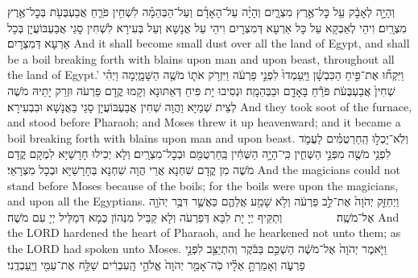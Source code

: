 {%
{וְהָיָ֣ה לְאָבָ֔ק עַ֖ל כׇּל־אֶ֣רֶץ מִצְרָ֑יִם וְהָיָ֨ה עַל־הָאָדָ֜ם וְעַל־הַבְּהֵמָ֗ה לִשְׁחִ֥ין פֹּרֵ֛חַ אֲבַעְבֻּעֹ֖ת בְּכׇל־אֶ֥רֶץ מִצְרָֽיִם׃
}
{וִיהֵי לְאַבְקָא עַל כָּל אַרְעָא דְּמִצְרָיִם וִיהֵי עַל אֲנָשָׁא וְעַל בְּעִירָא לִשְׁחִין סָגֵי אֲבַעְבּוֹעֲיָן בְּכָל אַרְעָא דְּמִצְרָיִם׃}
{And it shall become small dust over all the land of Egypt, and shall be a boil breaking forth with blains upon man and upon beast, throughout all the land of Egypt.’}{}
{וַיִּקְח֞וּ אֶת־פִּ֣יחַ הַכִּבְשָׁ֗ן וַיַּֽעַמְדוּ֙ לִפְנֵ֣י פַרְעֹ֔ה וַיִּזְרֹ֥ק אֹת֛וֹ מֹשֶׁ֖ה הַשָּׁמָ֑יְמָה וַיְהִ֗י שְׁחִין֙ אֲבַעְבֻּעֹ֔ת פֹּרֵ֕חַ בָּאָדָ֖ם וּבַבְּהֵמָֽה׃
}
{וּנְסִיבוּ יָת פִּיחַ דְּאַתּוּנָא וְקָמוּ קֳדָם פַּרְעֹה וּזְרַק יָתֵיהּ מֹשֶׁה לְצֵית שְׁמַיָּא וַהֲוָה שְׁחִין אֲבַעְבּוֹעֲיָן סָגֵי בַּאֲנָשָׁא וּבִבְעִירָא׃}
{And they took soot of the furnace, and stood before Pharaoh; and Moses threw it up heavenward; and it became a boil breaking forth with blains upon man and upon beast.}{}
{וְלֹֽא־יָכְל֣וּ הַֽחַרְטֻמִּ֗ים לַעֲמֹ֛ד לִפְנֵ֥י מֹשֶׁ֖ה מִפְּנֵ֣י הַשְּׁחִ֑ין כִּֽי־הָיָ֣ה הַשְּׁחִ֔ין בַּֽחַרְטֻמִּ֖ם וּבְכׇל־מִצְרָֽיִם׃}
{וְלָא יְכִילוּ חָרָשַׁיָּא לִמְקָם קֳדָם מֹשֶׁה מִן קֳדָם שִׁחְנָא אֲרֵי הֲוָה שִׁחְנָא בְּחָרָשַׁיָּא וּבְכָל מִצְרָאֵי׃}
{And the magicians could not stand before Moses because of the boils; for the boils were upon the magicians, and upon all the Egyptians.}{}
{וַיְחַזֵּ֤ק יְהֹוָה֙ אֶת־לֵ֣ב פַּרְעֹ֔ה וְלֹ֥א שָׁמַ֖ע אֲלֵהֶ֑ם כַּאֲשֶׁ֛ר דִּבֶּ֥ר יְהֹוָ֖ה אֶל־מֹשֶֽׁה׃ \setuma         }
{וְתַקֵּיף יְיָ יָת לִבָּא דְּפַרְעֹה וְלָא קַבֵּיל מִנְּהוֹן כְּמָא דְּמַלֵּיל יְיָ עִם מֹשֶׁה׃}
{And the LORD hardened the heart of Pharaoh, and he hearkened not unto them; as the LORD had spoken unto Moses.}{}
{וַיֹּ֤אמֶר יְהֹוָה֙ אֶל־מֹשֶׁ֔ה הַשְׁכֵּ֣ם בַּבֹּ֔קֶר וְהִתְיַצֵּ֖ב לִפְנֵ֣י פַרְעֹ֑ה וְאָמַרְתָּ֣ אֵלָ֗יו כֹּֽה־אָמַ֤ר יְהֹוָה֙ אֱלֹהֵ֣י הָֽעִבְרִ֔ים שַׁלַּ֥ח אֶת־עַמִּ֖י וְיַֽעַבְדֻֽנִי׃}
}
